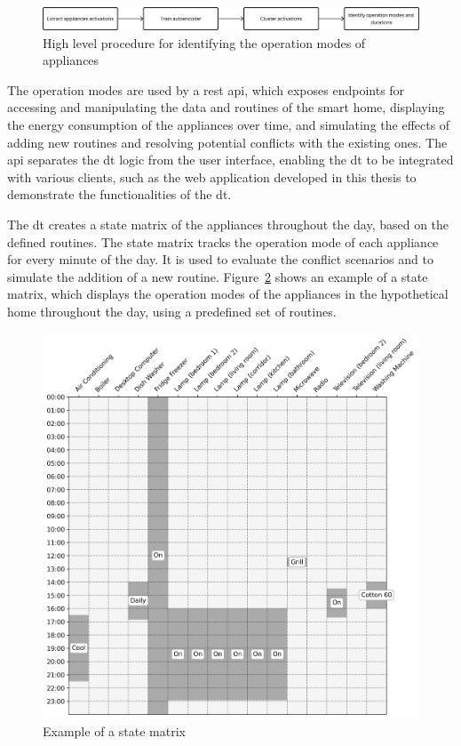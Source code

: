 \begin{figure}
    \centering
    \includegraphics[width=.8\linewidth]{images/high_level_procedure.png}
    \caption{High level procedure for identifying the operation modes of appliances}
    \label{fig:high-level-procedure}
\end{figure}

The operation modes are used by a \acrfull{rest} \acrfull{api}, which exposes endpoints for accessing and manipulating the data and
routines of the smart home, displaying the energy consumption of the appliances over time, and simulating the effects of adding new routines and resolving potential conflicts with the existing ones. The \acrshort{api} separates the \acrshort{dt} logic from the user interface, enabling the \acrshort{dt} to be integrated with various clients, such as the web application developed in this thesis to demonstrate the functionalities of the \acrshort{dt}.

The \acrshort{dt} creates a state matrix of the appliances throughout the day, based on the defined routines. The state matrix tracks the operation mode of each appliance for every minute of the day. It is used to evaluate the conflict scenarios and to simulate the addition of a new routine. Figure~\ref{fig:state-matrix} shows an example of a state matrix, which displays the operation modes of the appliances in the hypothetical home throughout the day, using a predefined set of routines.

\begin{figure}
    \centering
    \includegraphics[width=.5\linewidth]{images/real_matrix.png}
    \caption{Example of a state matrix}
    \label{fig:state-matrix}
\end{figure}

